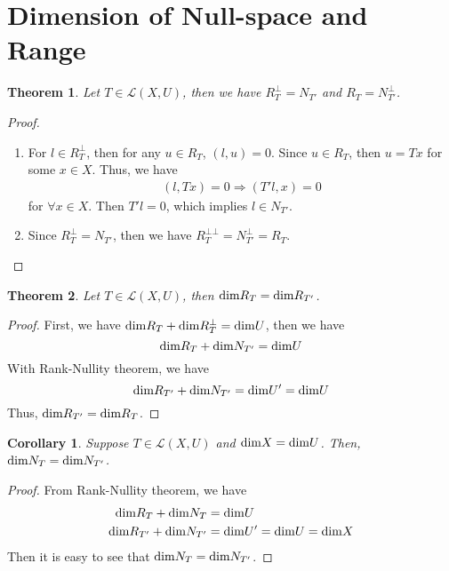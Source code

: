 \documentclass[11pt]{book}
\newtheorem{theorem}{Theorem}[section]
\newtheorem{corollary}{Corollary}[section]
\theoremstyle{definition}
\numberwithin{equation}{subsection}
\begin{document}
\section{Dimension of Null-space and Range}
\begin{theorem}
Let $T\in \mathscr{L}(X,U)$, then we have $R_T^\bot = N_{T'}$ and $R_T = N_{T'}^\bot$.
\end{theorem}
\begin{proof}
~\begin{enumerate}[label=(\arabic*)]
    \item For $l\in R_T^\bot$, then for any $u\in R_T$, $(l,u) = 0$. Since $u\in R_T$, then $u = T x$ for some $x\in X$. Thus, we have
    \begin{align*}
        (l, T x) = 0 \Rightarrow (T' l, x) = 0
    \end{align*}
    for $\forall x\in X$. Then $T' l = 0$, which implies $l\in N_{T'}$.
    \item Since $R_T^\bot = N_{T'}$, then we have $R_T^{\bot\bot} = N_{T'}^\bot = R_T$.
\end{enumerate}
\end{proof}

\medskip

\begin{theorem}
Let $T\in \mathscr{L}(X,U)$, then ${\rm dim}R_T = {\rm dim}R_{T'}$.
\end{theorem}
\begin{proof}
First, we have ${\rm dim}R_T + {\rm dim}R_T^\bot = {\rm dim}U$, then we have $${\rm dim}R_T + {\rm dim}N_{T'} = {\rm dim}U$$
With Rank-Nullity theorem, we have $${\rm dim}R_{T'} + {\rm dim}N_{T'} = {\rm dim}U' = {\rm dim}U$$ 
Thus, ${\rm dim}R_{T'} = {\rm dim}R_{T}$.
\end{proof}

\medskip

\begin{corollary}
Suppose $T\in \mathscr{L}(X,U)$ and ${\rm dim} X = {\rm dim} U$. Then, ${\rm dim}N_T = {\rm dim}N_{T'}$.
\end{corollary}
\begin{proof}
From Rank-Nullity theorem, we have 
\begin{align*}
    {\rm dim}R_T + {\rm dim}N_T & = {\rm dim}U \\
    {\rm dim}R_{T'} + {\rm dim}N_{T'} & = {\rm dim}U' = {\rm dim}U = {\rm dim}X
\end{align*}
Then it is easy to see that ${\rm dim}N_T = {\rm dim}N_{T'}$.
\end{proof}
\end{document}
